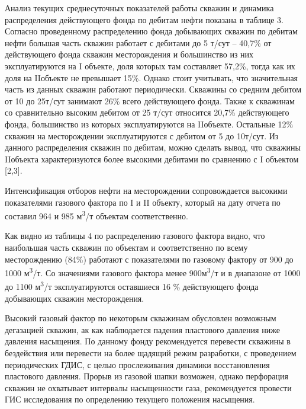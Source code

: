 \begin{multicols}{2}
Анализ текущих среднесуточных показателей работы скважин и динамика
распределения действующего фонда по дебитам нефти показана в таблице 3.
Согласно проведенному распределению фонда добывающих скважин по дебитам
нефти большая часть скважин работает с дебитами до 5 т/сут -- 40,7\% от
действующего фонда скважин месторождения и большинство из них
эксплуатируются на I объекте, доля которых там составляет 57,2\%, тогда
как их доля на IIобъекте не превышает 15\%. Однако стоит учитывать, что
значительная часть из данных скважин работают периодически. Скважины со
средним дебитом от 10 до 25т/сут занимают 26\% всего действующего фонда.
Также к скважинам со сравнительно высоким дебитом от 25 т/сут относится
20,7\% действующего фонда, большинство из которых эксплуатируются на
IIобъекте. Остальные 12\% скважин на месторождении эксплуатируются с
дебитом от 5 до 10т/сут. Из данного распределения скважин по дебитам,
можно сделать вывод, что скважины IIобъекта характеризуются более
высокими дебитами по сравнению с I объектом {[}2,3{]}.

Интенсификация отборов нефти на месторождении сопровождается высокими
показателями газового фактора по I и II объекту, который на дату отчета
по составил 964 и 985 м\textsuperscript{3}/т объектам соответственно.

Как видно из таблицы 4 по распределению газового фактора видно, что
наибольшая часть скважин по объектам и соответственно по всему
месторождению (84\%) работают с показателями по газовому фактору от 900
до 1000 м\textsuperscript{3}/т. Со значениями газового фактора менее
900м\textsuperscript{3}/т и в диапазоне от 1000 до 1100
м\textsuperscript{3}/т эксплуатируются оставшиеся 16 \% действующего
фонда добывающих скважин месторождения.

Высокий газовый фактор по некоторым скважинам обусловлен возможным
дегазацией скважин, ак как наблюдается падения пластового давления ниже
давления насыщения. По данному фонду рекомендуется перевести скважины в
бездействия или перевести на более щадящий режим разработки, с
проведением периодических ГДИС, с целью прослеживания динамики
восстановления пластового давления. Прорыв из газовой шапки возможен,
однако перфорация скважин не охватывает интервалы насыщенности газа,
рекомендуется провести ГИС исследования по определению текущего
положения насыщения.
\end{multicols}

